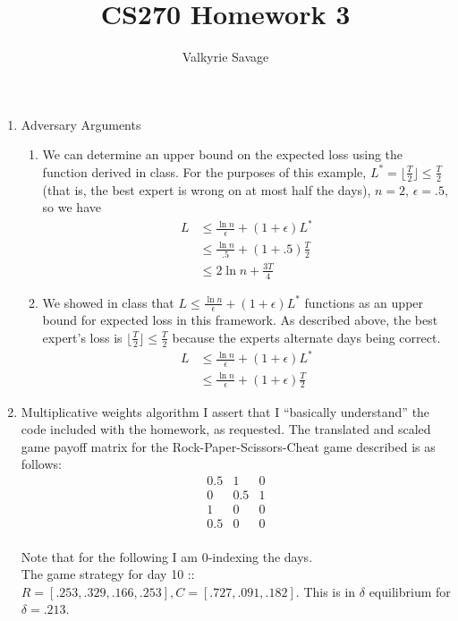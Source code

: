 \documentclass[a4paper]{article}
\title{CS270 Homework 3}
\author{Valkyrie Savage}
\begin{document}
\maketitle

\begin{enumerate}
\item Adversary Arguments
	\begin{enumerate}
	\item We can determine an upper bound on the expected loss using the function derived in class.  For the purposes of this example, $L^*=\lfloor \frac{T}{2} \rfloor \leq \frac{T}{2}$ (that is, the best expert is wrong on at most half the days), $n=2$, $\epsilon = .5$, so we have
		\begin{align*}
			L &\leq \frac{\ln n}{\epsilon} + (1 + \epsilon) L^* \\
			&\leq \frac{\ln n}{.5} + (1 + .5)\frac{T}{2} \\
			&\leq 2 \ln n + \frac{3T}{4}
		\end{align*}
	\item We showed in class that $L \leq \frac{\ln n}{\epsilon} + (1 + \epsilon) L^*$ functions as an upper bound for expected loss in this framework.  As described above, the best expert's loss is $\lfloor \frac{T}{2} \rfloor \leq \frac{T}{2}$ because the experts alternate days being correct.
		\begin{align*}
			L &\leq \frac{\ln n}{\epsilon} + (1 + \epsilon) L^* \\
			&\leq \frac{\ln n}{\epsilon} + (1 + \epsilon) \frac{T}{2}
		\end{align*}
	\end{enumerate}
\item Multiplicative weights algorithm
I assert that I ``basically understand'' the code included with the homework, as requested.
The translated and scaled game payoff matrix for the Rock-Paper-Scissors-Cheat game described is as follows:
\[ \begin{array}{ccc}
0.5 & 1 & 0 \\
0 & 0.5 & 1 \\
1 & 0 & 0 \\
0.5 & 0 & 0 \end{array} \]\\
Note that for the following I am 0-indexing the days. \\
The game strategy for day 10 :: $R = [.253, .329, .166, .253], C = [.727, .091, .182]$.  This is in $\delta$ equilibrium for $\delta = .213$.\\

\end{enumerate}
\end{document}
